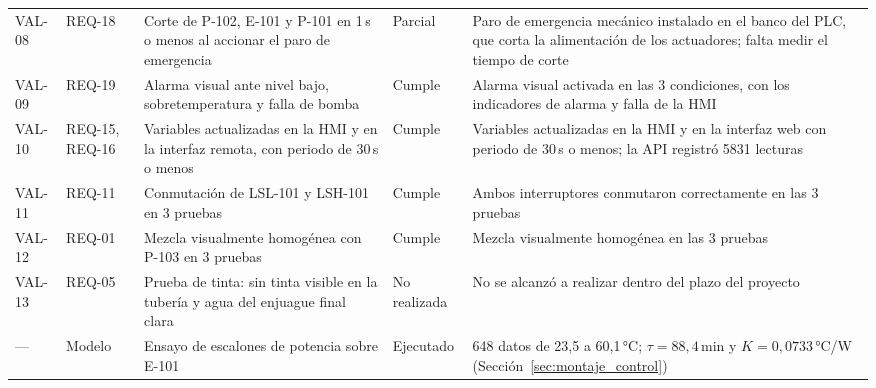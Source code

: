 \begin{longtable}{L{1.1cm}L{1.2cm}L{5.2cm}L{1.4cm}L{\dimexpr\textwidth-8.9cm-8\tabcolsep\relax}}
VAL-08 & REQ-18 & Corte de P-102, E-101 y P-101 en 1\,s o menos al accionar el paro de emergencia & Parcial & Paro de emergencia mecánico instalado en el banco del PLC, que corta la alimentación de los actuadores; falta medir el tiempo de corte\\
VAL-09 & REQ-19 & Alarma visual ante nivel bajo, sobretemperatura y falla de bomba & Cumple & Alarma visual activada en las 3 condiciones, con los indicadores de alarma y falla de la HMI\\
VAL-10 & REQ-15, REQ-16 & Variables actualizadas en la HMI y en la interfaz remota, con periodo de 30\,s o menos & Cumple & Variables actualizadas en la HMI y en la interfaz web con periodo de 30\,s o menos; la API registró 5831 lecturas\\
VAL-11 & REQ-11 & Conmutación de LSL-101 y LSH-101 en 3 pruebas & Cumple & Ambos interruptores conmutaron correctamente en las 3 pruebas\\
VAL-12 & REQ-01 & Mezcla visualmente homogénea con P-103 en 3 pruebas & Cumple & Mezcla visualmente homogénea en las 3 pruebas\\
VAL-13 & REQ-05 & Prueba de tinta: sin tinta visible en la tubería y agua del enjuague final clara & No realizada & No se alcanzó a realizar dentro del plazo del proyecto\\
--- & Modelo & Ensayo de escalones de potencia sobre E-101 & Ejecutado & 648 datos de 23,5 a 60,1\,°C; $\tau = 88{,}4$\,min y $K = 0{,}0733$\,°C/W (Sección~\ref{sec:montaje_control})\\
\end{longtable}
\endgroup
